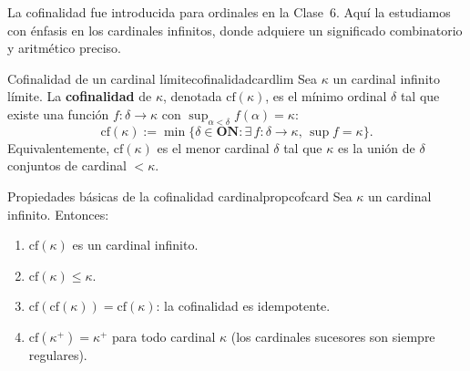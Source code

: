La cofinalidad fue introducida para ordinales en la Clase~6. Aquí la estudiamos con énfasis en los cardinales infinitos, donde adquiere un significado combinatorio y aritmético preciso.

\begin{definicion}{Cofinalidad de un cardinal límite}{cofinalidadcardlim}
Sea $\kappa$ un cardinal infinito límite. La \textbf{cofinalidad} de $\kappa$, denotada $\mathrm{cf}(\kappa)$, es el mínimo ordinal $\delta$ tal que existe una función $f \colon \delta \to \kappa$ con $\sup_{\alpha < \delta} f(\alpha) = \kappa$:
\[
  \mathrm{cf}(\kappa) := \min\bigl\{\delta \in \mathbf{ON} : \exists\, f \colon \delta \to \kappa,\, \sup f = \kappa\bigr\}.
\]
Equivalentemente, $\mathrm{cf}(\kappa)$ es el menor cardinal $\delta$ tal que $\kappa$ es la unión de $\delta$ conjuntos de cardinal $< \kappa$.
\end{definicion}

\begin{proposicion}{Propiedades básicas de la cofinalidad cardinal}{propcofcard}
Sea $\kappa$ un cardinal infinito. Entonces:
\begin{enumerate}[leftmargin=2em, label=(\roman*)]
  \item $\mathrm{cf}(\kappa)$ es un cardinal infinito.
  \item $\mathrm{cf}(\kappa) \leq \kappa$.
  \item $\mathrm{cf}(\mathrm{cf}(\kappa)) = \mathrm{cf}(\kappa)$: la cofinalidad es idempotente.
  \item $\mathrm{cf}(\kappa^+) = \kappa^+$ para todo cardinal $\kappa$ (los cardinales sucesores son siempre regulares).
\end{enumerate}
\end{proposicion}

